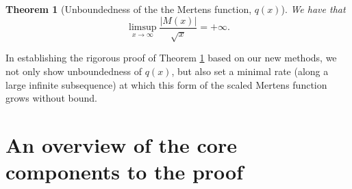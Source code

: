 \documentclass[11pt,reqno,a4letter]{article}
\numberwithin{figure}{section}
\numberwithin{table}{section}
\theoremstyle{plain}
\newtheorem{theorem}{Theorem}
\numberwithin{theorem}{section}
\theoremstyle{definition}
\begin{document}
\begin{theorem}[Unboundedness of the the Mertens function, $q(x)$] 
\label{cor_ThePipeDreamResult_v1} 
We have that 
\[
\limsup_{x \rightarrow \infty} \frac{|M(x)|}{\sqrt{x}} = +\infty. 
\]
\end{theorem} 

In establishing the rigorous proof of 
Theorem \ref{cor_ThePipeDreamResult_v1} 
based on our new methods, we not only show unboundedness of 
$q(x)$, but also set a minimal rate (along a large infinite subsequence) 
at which this form of the 
scaled Mertens function grows without bound. 

\newpage
\section{An overview of the core components to the proof} 
\end{document}
